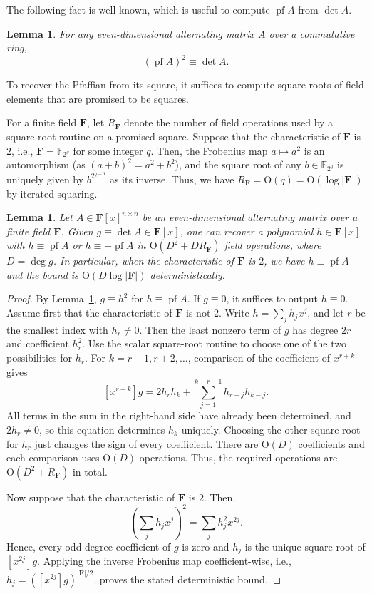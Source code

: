 \documentclass[11pt, a4paper]{article}
\theoremstyle{plain}
\newtheorem{lemma}[theorem]{Lemma}
\theoremstyle{definition}
\theoremstyle{remark}
\newcommand{\bF}{\mathbf{F}}
\DeclareMathOperator{\pf}{pf}
\begin{document}
The following fact is well known, which is useful to compute $\pf A$ from $\det A$.

\begin{lemma}\label{lem:pf-square}
For any even-dimensional alternating matrix $A$ over a commutative ring,
\[(\pf A)^2\equiv\det A.\]
\end{lemma}

To recover the Pfaffian from its square, it suffices to compute square roots of field elements that are promised to be squares.

For a finite field $\bF$, let $R_{\bF}$ denote the number of field operations used by a square-root routine on a promised square.
Suppose that the characteristic of $\mathbf{F}$ is $2$, i.e., $\bF=\mathbb{F}_{2^q}$ for some integer $q$.
Then, the Frobenius map $a\mapsto a^2$ is an automorphism (as $(a + b)^2 = a^2 + b^2$), and the square root of any $b \in \mathbb{F}_{2^q}$ is uniquely given by $b^{2^{q-1}}$ as its inverse.
Thus, we have $R_{\bF}=\mathrm{O}(q)=\mathrm{O}(\log|\bF|)$ by iterated squaring.

\begin{lemma}\label{lem:pfaffian}
Let $A\in\bF[x]^{n\times n}$ be an even-dimensional alternating matrix over a finite field $\bF$.
Given $g\equiv\det A \in \bF[x]$, one can recover a polynomial $h\in \bF[x]$ with $h\equiv\pf A$ or $h\equiv-\pf A$ in $\mathrm{O}(D^2+D R_{\bF})$ field operations, where $D=\deg g$.
In particular, when the characteristic of $\mathbf{F}$ is $2$, we have $h\equiv\pf A$ and the bound is $\mathrm{O}(D\log|\bF|)$ deterministically.
\end{lemma}

\begin{proof}
By Lemma~\ref{lem:pf-square}, $g\equiv h^2$ for $h\equiv \pf A$.
If $g\equiv 0$, it suffices to output $h \equiv 0$.
Assume first that the characteristic of $\mathbf{F}$ is not $2$.
Write $h=\sum_jh_jx^j$, and let $r$ be the smallest index with $h_r\ne0$.
Then the least nonzero term of $g$ has degree $2r$ and coefficient $h_r^2$.
Use the scalar square-root routine to choose one of the two possibilities for $h_r$.
For $k=r+1,r+2,\dots$, comparison of the coefficient of $x^{r+k}$ gives
\[[x^{r+k}]g = 2h_rh_k + \sum_{j = 1}^{k - r - 1}h_{r+j}h_{k-j}.\]
All terms in the sum in the right-hand side have already been determined, and $2h_r\ne0$, so this equation determines $h_k$ uniquely.
Choosing the other square root for $h_r$ just changes the sign of every coefficient.
There are $\mathrm{O}(D)$ coefficients and each comparison uses $\mathrm{O}(D)$ operations.
Thus, the required operations are $\mathrm{O}(D^2 + R_\bF)$ in total.

Now suppose that the characteristic of $\mathbf{F}$ is $2$.
Then,
\[\left(\sum_jh_jx^j\right)^2=\sum_jh_j^2x^{2j}.\]
Hence, every odd-degree coefficient of $g$ is zero and $h_j$ is the unique square root of $[x^{2j}]g$.
Applying the inverse Frobenius map coefficient-wise, i.e., $h_j = ([x^{2j}]g)^{|\bF|/2}$, proves the stated deterministic bound.
\end{proof}
\end{document}
